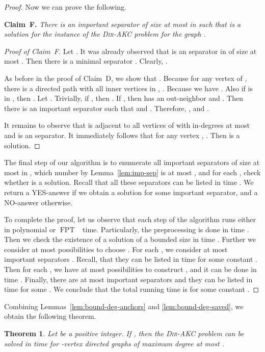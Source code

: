 \documentclass[11pt,a4paper]{article}
\newtheorem{theorem}{Theorem}
\DeclareMathOperator{\operatorClassFPT}{FPT}
\newcommand{\classFPT}{\ensuremath{\operatorClassFPT}}
\newcommand{\DAKC}{\textsc{Dir-AKC}\xspace}
\begin{document}
\begin{proof}
Now we can prove the following.

\medskip
\noindent
{\bf Claim~F.} {\it
There is an important  separator  of size at most  in  such that  is a solution for the instance of the \DAKC problem for the graph .
}


\begin{proof}[Proof of Claim~F]
Let . It was already observed that  is an  separator in  of size
at most . Then there is a minimal  separator . Clearly, .

As before in the proof of Claim~D, we show that  . Because for any vertex
 of , there is a directed  path with all inner vertices in , . Because  we have . Also if   is in  , then . Let . Trivially, if , then . If  , then  has an out-neighbor
 and . Then there is an important  separator  such that
 and . Therefore, , and .

It remains to observe that  is adjacent to all vertices of  with in-degrees at most  and  is an 
separator. It immediately follows that for any  vertex , . Then
 is a solution.
\end{proof}

The final step of our algorithm is to enumerate all important  separators  of size at most  in , which
number by Lemma~\ref{lem:imp-sep} is at most , and for each , check whether  is a solution. Recall that all these separators can be listed in time . We return a YES-answer
if we obtain a solution for some important separator, and a NO-answer otherwise.

To complete the proof, let us observe that each step of the algorithm runs either in polynomial or \classFPT~ time.
Particularly, the preprocessing is done in time . Then we check the existence of a solution of a bounded size in
time . Further we consider at most  possibilities to choose . For each , we consider
at most  important  separators . Recall, that they can be listed in time
 for some constant . Then for each , we have  at most   possibilities to construct , and it can be done in time .
Finally, there are at most  important  separators  and they can be listed in time  for
some . We conclude that the total running time is  for some constant .
\end{proof}

Combining Lemmas~\ref{lem:bound-deg-anchors} and \ref{lem:bound-deg-saved}, we obtain the following theorem.

\begin{theorem}\label{thm:bound-deg}
Let  be a positive integer. If , then the \DAKC problem can be solved in time  for -vertex directed graphs of maximum degree at most .
\end{theorem}
\end{document}
